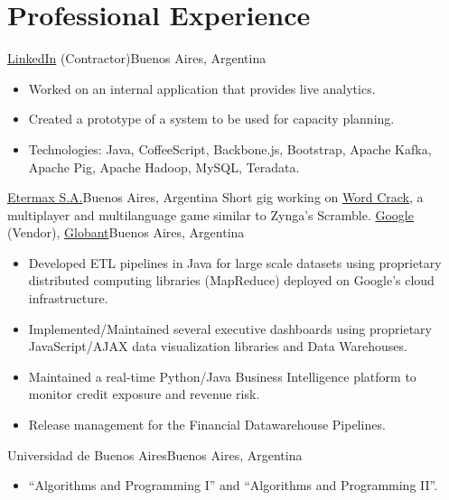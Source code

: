 \documentclass[11pt,a4paper]{moderncv}
\newcommand\weblink[2] {{\color{href} \href{#1}{#2}}}
\begin{document}
\section{Professional Experience}
{\weblink{http://linkedin.com/}{LinkedIn} (Contractor)}{Buenos Aires, Argentina}{}{%
\begin{itemize}
  \item Worked on an internal application that provides live analytics.
  \item Created a prototype of a system to be used for capacity planning.
  \item Technologies: Java, CoffeeScript, Backbone.js, Bootstrap, Apache Kafka,
    Apache Pig, Apache Hadoop, MySQL, Teradata.
\end{itemize}
}
%
{\weblink{http://etermax.com/}{Etermax S.A.}}{Buenos Aires, Argentina}{}{%
Short gig working on
\weblink{https://play.google.com/store/apps/details?id=com.etermax.wordcrack.lite}{Word
Crack}, a multiplayer and multilanguage game similar to Zynga's Scramble.}
%
{\weblink{http://www.google.com}{Google} (Vendor),
\weblink{http://www.globant.com}{Globant}}{Buenos Aires, Argentina}{}{%
\begin{itemize}
  \item Developed ETL pipelines in Java for large scale datasets using
proprietary distributed computing libraries (MapReduce) deployed on Google's
cloud infrastructure.
  \item Implemented/Maintained several executive dashboards using proprietary
JavaScript/AJAX data visualization libraries and Data Warehouses.
  \item Maintained a real-time Python/Java Business Intelligence platform to
monitor credit exposure and revenue risk.
  \item Release management for the Financial Datawarehouse Pipelines.
\end{itemize}
}
%
{Universidad de Buenos Aires}{Buenos Aires, Argentina}{}{%
\begin{itemize}%
  \item ``Algorithms and Programming I'' and ``Algorithms and Programming II''.
\end{itemize}
}
\end{document}
